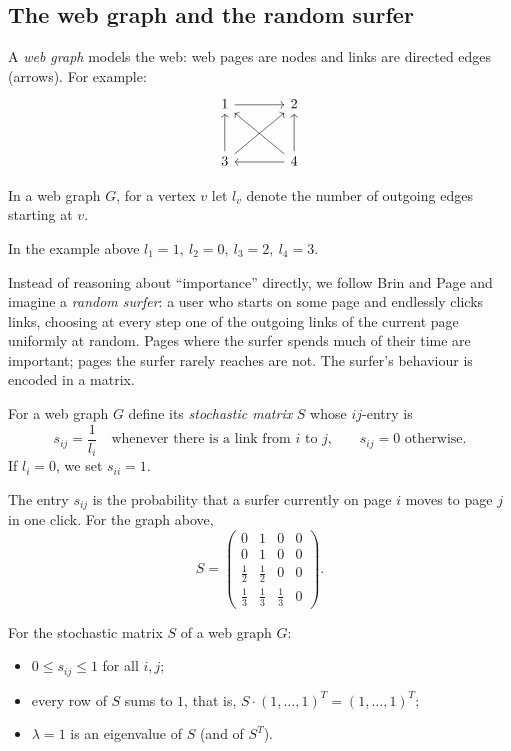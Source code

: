\subsection{The web graph and the random surfer}

A \emph{web graph} models the web: web pages are nodes and links are directed edges (arrows). For example:
\[
\begin{tikzcd}[row sep=large, column sep=large]
1 \arrow[r] & 2 \\
3 \arrow[u]\arrow[ur] & 4 \arrow[ul]\arrow[l]\arrow[u]
\end{tikzcd}
\]

\begin{definition}
In a web graph $G$, for a vertex $v$ let $l_v$ denote the number of outgoing edges starting at $v$.
\end{definition}

\noindent In the example above $l_1=1,\ l_2=0,\ l_3=2,\ l_4=3$.

Instead of reasoning about ``importance'' directly, we follow Brin and Page and imagine a \emph{random
surfer}: a user who starts on some page and endlessly clicks links, choosing at every step one of the
outgoing links of the current page uniformly at random. Pages where the surfer spends much of their time
are important; pages the surfer rarely reaches are not. The surfer's behaviour is encoded in a matrix.

\begin{definition}
For a web graph $G$ define its \emph{stochastic matrix} $S$ whose $ij$-entry is
\[
s_{ij} = \frac{1}{l_i} \quad\text{whenever there is a link from $i$ to $j$,} \qquad s_{ij}=0 \text{ otherwise.}
\]
If $l_i=0$, we set $s_{ii}=1$.
\end{definition}

\noindent The entry $s_{ij}$ is the probability that a surfer currently on page $i$ moves to page $j$ in
one click. For the graph above,
\[
S=\left( \begin{array}{cccc}
0 & 1 & 0 & 0\\
0 & 1 & 0 & 0\\
\tfrac{1}{2} & \tfrac{1}{2} & 0 & 0\\
\tfrac{1}{3} & \tfrac{1}{3} & \tfrac{1}{3} & 0
\end{array} \right).
\]

\begin{fact}
For the stochastic matrix $S$ of a web graph $G$:
\begin{itemize}
\item $0\leq s_{ij} \leq 1$ for all $i,j$;
\item every row of $S$ sums to $1$, that is, $S\cdot (1,\ldots,1)^T = (1,\ldots,1)^T$;
\item $\lambda = 1$ is an eigenvalue of $S$ (and of $S^T$).
\end{itemize}
\end{fact}

